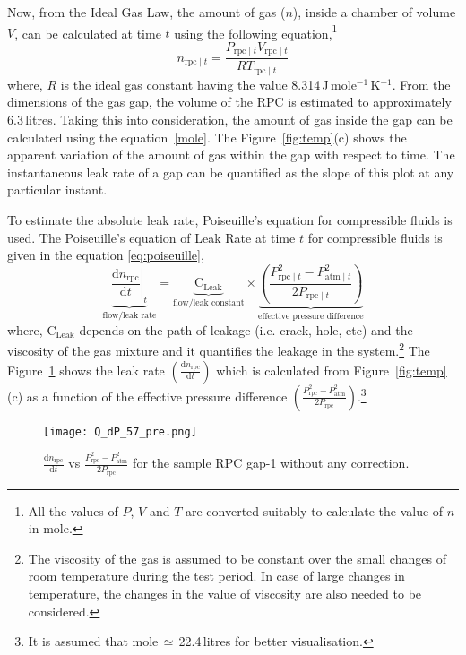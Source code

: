 Now, from the Ideal Gas Law, the amount of gas ($n$), inside a chamber of
volume $V$, can be calculated at time $t$ using the following equation,\footnote{All the values of $P$, $V$ and $T$ are converted suitably to calculate the value of $n$ in mole.}
\begin{equation}
  n_{\textrm{rpc}\mid t}=\frac{P_{\textrm{rpc}\mid t}V_{\textrm{rpc}\mid t}}{RT_{\textrm{rpc}\mid t}} \label{mole}
\end{equation}
where, $R$ is the ideal gas constant having the value
8.314\,J\,mole$^{-1}$\,K$^{-1}$. From the dimensions of the gas gap,
the volume of the RPC is estimated to approximately 6.3\,litres.
Taking this into consideration, the amount of gas inside the gap can
be calculated using the equation~\ref{mole}.
The Figure~\ref{fig:temp}(c) shows the apparent variation
of the amount of gas within the gap with respect to time.
The instantaneous leak rate of a gap can be quantified as the slope
of this plot at any particular instant.

To estimate the absolute leak rate, Poiseuille's equation for compressible
fluids\cite{poiseuille} is used. The Poiseuille's equation of Leak Rate at time
$t$ for compressible fluids is given in the equation \ref{eq:poiseuille},
\begin{equation}
  \underbrace{\left.\frac{\mathrm{d}n_{\textrm{rpc}}}{\mathrm{d}t}\right| _t}_\text{flow/leak rate}=\underbrace{\textrm{C}_{\textrm{Leak}}}_\text{flow/leak constant}\times\underbrace{\left(\frac {P_{{\textrm{rpc}\mid t} }^{2}-P_{{\textrm{atm}\mid t} }^{2}}{2P_{{\textrm{rpc}\mid t} }}\right)}_\text{effective pressure difference}\label{eq:poiseuille}
\end{equation}
where, $\textrm{C}_{\textrm{Leak}}$ depends on the path of leakage (i.e. crack,
hole, etc) and the viscosity of the gas mixture and it quantifies the leakage
in the system.\footnote{The viscosity of the gas is assumed to be constant over
  the small changes of room temperature during the test period. In case of
  large changes in temperature, the changes in the value of viscosity are also
  needed to be considered.} The Figure~\ref{fig:preQt} shows the leak rate
$\left(\frac{\mathrm{d}n_{\textrm{rpc}}}{\mathrm{d}t}\right)$ which is calculated
from Figure~\ref{fig:temp}(c) as a function of the effective pressure
difference $\left(\frac{P_{\textrm{rpc}}^{2}-P_{\textrm{atm}}^{2}}{2P_{\textrm{rpc}}}\right)$.\footnote{It is assumed that mole\,$\simeq$\,22.4\,litres for better visualisation.} 
\begin{figure}
  \centering
  \texttt{[image: Q\_dP\_57\_pre.png]}
  \caption{$\frac{\mathrm{d}n_{\textrm{rpc}}}{\mathrm{d}t}$ vs
    $\frac{P_{\textrm{rpc}}^{2}-P_{\textrm{atm}}^{2}}{2P_{\textrm{rpc}}}$ for the sample
    RPC gap-1 without any correction.}
  \label{fig:preQt}
\end{figure}

